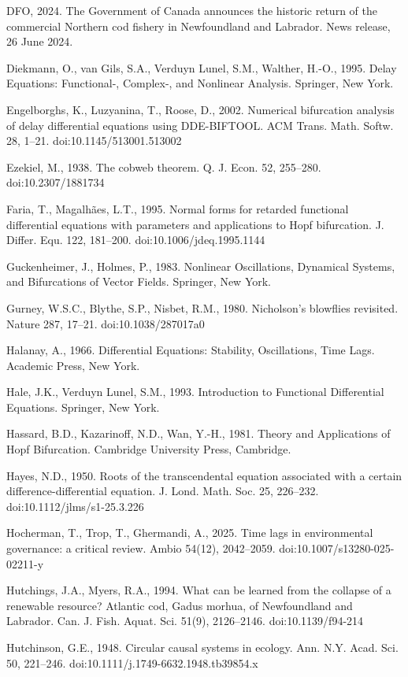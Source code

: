 \documentclass[11pt]{article}
\begin{document}
DFO, 2024. The Government of Canada announces the historic return of the
commercial Northern cod fishery in Newfoundland and Labrador. News
release, 26 June 2024.

Diekmann, O., van Gils, S.A., Verduyn Lunel, S.M., Walther, H.-O., 1995.
Delay Equations: Functional-, Complex-, and Nonlinear Analysis.
Springer, New York.

Engelborghs, K., Luzyanina, T., Roose, D., 2002. Numerical bifurcation
analysis of delay differential equations using DDE-BIFTOOL. ACM Trans.
Math. Softw. 28, 1--21. doi:10.1145/513001.513002

Ezekiel, M., 1938. The cobweb theorem. Q. J. Econ. 52, 255--280.
doi:10.2307/1881734

Faria, T., Magalh\~aes, L.T., 1995. Normal forms for retarded functional
differential equations with parameters and applications to Hopf
bifurcation. J. Differ. Equ. 122, 181--200. doi:10.1006/jdeq.1995.1144

Guckenheimer, J., Holmes, P., 1983. Nonlinear Oscillations, Dynamical
Systems, and Bifurcations of Vector Fields. Springer, New York.

Gurney, W.S.C., Blythe, S.P., Nisbet, R.M., 1980. Nicholson's blowflies
revisited. Nature 287, 17--21. doi:10.1038/287017a0

Halanay, A., 1966. Differential Equations: Stability, Oscillations, Time
Lags. Academic Press, New York.

Hale, J.K., Verduyn Lunel, S.M., 1993. Introduction to Functional
Differential Equations. Springer, New York.

Hassard, B.D., Kazarinoff, N.D., Wan, Y.-H., 1981. Theory and
Applications of Hopf Bifurcation. Cambridge University Press, Cambridge.

Hayes, N.D., 1950. Roots of the transcendental equation associated with
a certain difference-differential equation. J. Lond. Math. Soc. 25,
226--232. doi:10.1112/jlms/s1-25.3.226

Hocherman, T., Trop, T., Ghermandi, A., 2025. Time lags in environmental
governance: a critical review. Ambio 54(12), 2042--2059.
doi:10.1007/s13280-025-02211-y

Hutchings, J.A., Myers, R.A., 1994. What can be learned from the
collapse of a renewable resource? Atlantic cod, Gadus morhua, of
Newfoundland and Labrador. Can. J. Fish. Aquat. Sci. 51(9), 2126--2146.
doi:10.1139/f94-214

Hutchinson, G.E., 1948. Circular causal systems in ecology. Ann. N.Y.
Acad. Sci. 50, 221--246. doi:10.1111/j.1749-6632.1948.tb39854.x
\end{document}
